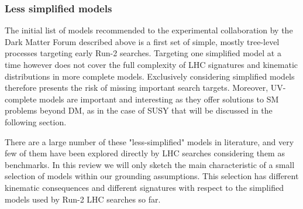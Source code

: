 

\subsubsection{Less simplified models}
\label{sec:LessSimplifiedModels}

The initial list of models recommended to the experimental collaboration by the Dark Matter Forum described above is a first set of simple, mostly tree-level processes targeting early Run-2 searches. Targeting one simplified model at a time however does not cover the full complexity of LHC signatures and kinematic distributions in more complete models. Exclusively considering simplified models therefore presents the risk of missing important search targets. Moreover, UV-complete models are important and interesting as they offer solutions to SM problems beyond DM, as in the case of SUSY that will be discussed in the following section. 

There are a large number of these "less-simplified" models in literature, and very few of them have been explored directly by LHC searches considering them as benchmarks. In this review we will only sketch the main characteristic of a small selection of models within our grounding assumptions. This selection has different kinematic consequences and different signatures with respect to the simplified models used by Run-2 LHC searches so far. 

